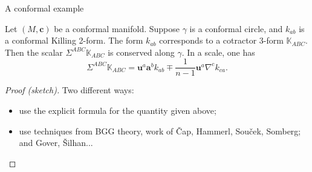 \documentclass{beamer}
\begin{document}
\begin{frame}{A conformal example}
  \begin{Theorem}
    Let \( (M,\bm{c}) \) be a conformal manifold.
    Suppose \( \gamma \) is a conformal circle, and \( k_{ab} \) is a conformal
    Killing 2-form.
    The form \( k_{ab} \) corresponds to a cotractor 3-form \( \mathbb{K}_{ABC}
    \).
    Then the scalar \( \Sigma^{ABC} \mathbb{K}_{ABC} \) is conserved along \(
    \gamma \).
    In a scale, one has
    \[
      \Sigma^{ABC} \mathbb{K}_{ABC} = \mathbf{u}^a \mathbf{a}^b k_{ab} \mp \frac{1}{n-1} \mathbf{u}^a \nabla^c k_{ca}.
    \]
  \end{Theorem}
  \pause
  \begin{proof}[Proof (sketch)]
    Two different ways:
    \begin{itemize}
      \item use the explicit formula for the quantity given above;
      \item use techniques from BGG theory, work of \v{C}ap, Hammerl, Sou\v{c}ek, Somberg; and Gover, \v{S}ilhan...
    \end{itemize}
  \end{proof}
\end{frame}
\end{document}
